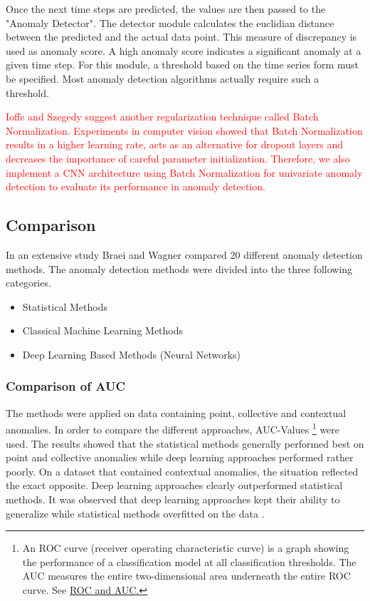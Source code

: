 Once the next time steps are predicted, the values are then passed to the "Anomaly Detector". The detector module calculates the euclidian distance between the predicted and the actual data point. This measure of discrepancy is used as anomaly score. A high anomaly score indicates a significant anomaly at a given time step. For this module, a threshold based on the time series form must be specified. Most anomaly detection algorithms actually require such a threshold.


\textcolor{red}{ Ioffe and Szegedy suggest another regularization technique called Batch Normalization. Experiments in computer vision showed that Batch Normalization results in a higher learning rate, acts as an alternative for dropout layers and decreases the importance of careful parameter initialization. Therefore, we also implement a CNN architecture using Batch Normalization for univariate anomaly detection to evaluate its performance in anomaly detection.}

\subsection{Comparison}
In an extensive study Braei and Wagner \parencite*{Braei2020} compared 20 different anomaly detection methods. The anomaly detection methods were divided into the three following  categories. 

\begin{itemize}
	\item Statistical Methods
	\item Classical Machine Learning Methods
	\item Deep Learning Based Methods (Neural Networks)
\end{itemize}


\subsubsection{Comparison of AUC}
The methods were applied on data containing point, collective and contextual anomalies. In order to compare the different approaches, AUC-Values \footnote{An ROC curve (receiver operating characteristic curve) is a graph showing the performance of a classification model at all classification thresholds. The AUC measures the entire two-dimensional area underneath the entire ROC curve. See \hyperlink{https://developers.google.com/machine-learning/crash-course/classification/roc-and-auc}{ROC and AUC.}} were used. The results showed that the statistical methods generally performed best on point and collective anomalies while deep learning approaches performed rather poorly. On a dataset that contained contextual anomalies, the situation reflected the exact opposite. Deep learning approaches clearly outperformed statistical methods. It was observed that deep learning approaches kept their ability to generalize while statistical methods overfitted on the data \parencite{Braei2020}.


